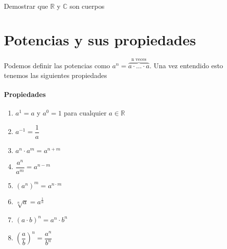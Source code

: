 \begin{ejerci}

Demostrar que $\mathbb{R}$ y $\mathbb{C}$ son cuerpos 

\end{ejerci}



\section{Potencias y sus propiedades}
\begin{defi}
Podemos definir las potencias como  $a^n=\overbrace{a \cdot\ldots \cdot a}^{\text{n veces}}$. Una vez entendido esto tenemos las siguientes propiedades
\end{defi}

\paragraph{Propiedades}
\begin{enumerate}
\item $a^1=a$ y $a^0=1$ para cualquier $a\in\mathbb{R}$
\item $a^{-1}=\dfrac{1}{a}$
\item $a^n\cdot a^m=a^{n+m}$
\item $\dfrac{a^n}{a^m}=a^{n-m} $
\item $\left( a^n \right) ^m =a^{n \cdot m}$
\item $\sqrt[n]{a}=a^{\frac{1}{n}}$
\item $(a \cdot b)^n=a^n \cdot b^n$
\item $ \left(\dfrac{a}{b}\right)^n=\dfrac{a^n}{b^n}$
\end{enumerate}
